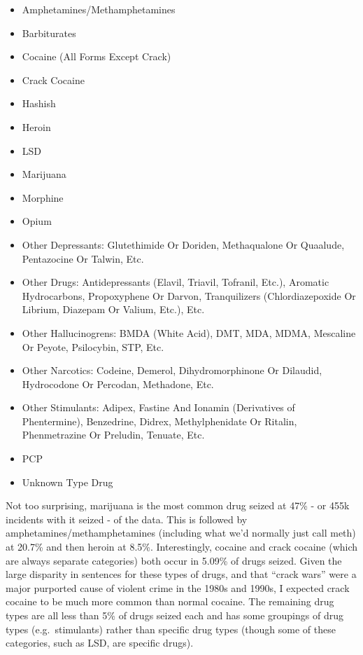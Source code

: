 \documentclass[
]{krantz}
\providecommand{\tightlist}{%
  \setlength{\itemsep}{0pt}\setlength{\parskip}{0pt}}
\begin{document}
\begin{itemize}
\tightlist
\item
  Amphetamines/Methamphetamines
\item
  Barbiturates
\item
  Cocaine (All Forms Except Crack)
\item
  Crack Cocaine
\item
  Hashish
\item
  Heroin
\item
  LSD
\item
  Marijuana
\item
  Morphine
\item
  Opium
\item
  Other Depressants: Glutethimide Or Doriden, Methaqualone
  Or Quaalude, Pentazocine Or Talwin, Etc.
\item
  Other Drugs: Antidepressants (Elavil, Triavil, Tofranil,
  Etc.), Aromatic Hydrocarbons, Propoxyphene Or Darvon,
  Tranquilizers (Chlordiazepoxide Or Librium, Diazepam Or
  Valium, Etc.), Etc.
\item
  Other Hallucinogrens: BMDA (White Acid), DMT, MDA, MDMA,
  Mescaline Or Peyote, Psilocybin, STP, Etc.
\item
  Other Narcotics: Codeine, Demerol, Dihydromorphinone Or
  Dilaudid, Hydrocodone Or Percodan, Methadone, Etc.
\item
  Other Stimulants: Adipex, Fastine And Ionamin (Derivatives
  of Phentermine), Benzedrine, Didrex, Methylphenidate Or
  Ritalin, Phenmetrazine Or Preludin, Tenuate, Etc.
\item
  PCP
\item
  Unknown Type Drug
\end{itemize}

Not too surprising, marijuana is the most common drug seized
at 47\% - or 455k incidents with it seized - of the data.
This is followed by amphetamines/methamphetamines (including
what we'd normally just call meth) at 20.7\% and then heroin
at 8.5\%. Interestingly, cocaine and crack cocaine (which
are always separate categories) both occur in 5.09\% of
drugs seized. Given the large disparity in sentences for
these types of drugs, and that ``crack wars'' were a major
purported cause of violent crime in the 1980s and 1990s, I
expected crack cocaine to be much more common than normal
cocaine. The remaining drug types are all less than 5\% of
drugs seized each and has some groupings of drug types
(e.g.~stimulants) rather than specific drug types (though
some of these categories, such as LSD, are specific drugs).
\end{document}
